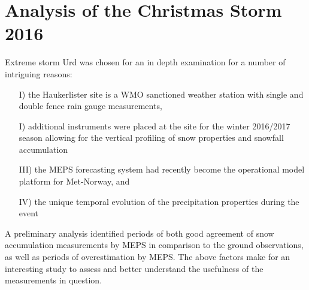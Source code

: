 \chapter{Analysis of the Christmas Storm 2016}\label{ch:weather_ana}
Extreme storm Urd was chosen for an in depth examination for a number of intriguing reasons:  
\begin{itemize}
	\item[I)] the Haukerlister site is a WMO sanctioned weather station with single and double fence rain gauge measurements,
	\item[I)] additional instruments were placed at the site for the winter 2016/2017 season allowing for the vertical profiling of snow properties and snowfall accumulation
	\item[III)] the MEPS forecasting system had recently become the operational model platform for Met-Norway, and
	\item[IV)] the unique temporal evolution of the precipitation properties during the event
\end{itemize}
A preliminary analysis identified periods of both good agreement of snow accumulation measurements by MEPS in comparison to the ground observations, as well as periods of overestimation by MEPS. The above factors make for an interesting study to assess and better understand the usefulness of the measurements in question.
